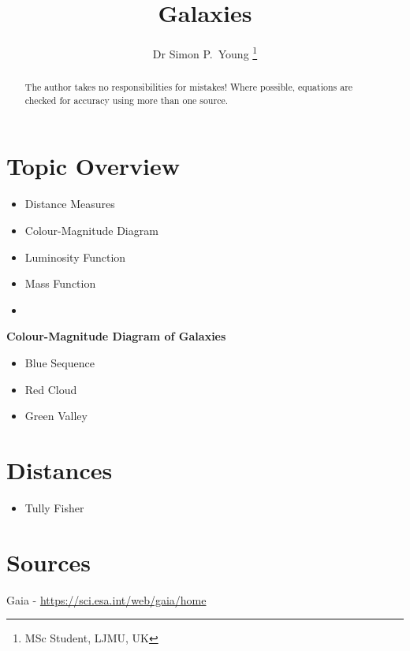 \documentclass{article}
\author{Dr Simon P.~Young \thanks{MSc Student, LJMU, UK}}
\title {Galaxies}
\begin{document}
\maketitle


\begin{abstract}
The author takes no responsibilities for mistakes! Where possible, equations are checked for accuracy using more than one source.
\end{abstract}

\tableofcontents

\newpage

\section {Topic Overview}

\begin{itemize}
  \item Distance Measures
  \item Colour-Magnitude Diagram
  \item Luminosity Function
  \item Mass Function
  \item 
\end{itemize}

\newpage
\textbf{Colour-Magnitude Diagram of Galaxies}
\begin{itemize}
  \item Blue Sequence
  \item Red Cloud
  \item Green Valley
\end{itemize}


\section {Distances}

\begin{itemize}
    \item Tully Fisher
\end{itemize}


\newpage

\section {Sources}
Gaia - \url{https://sci.esa.int/web/gaia/home}
\end{document}
